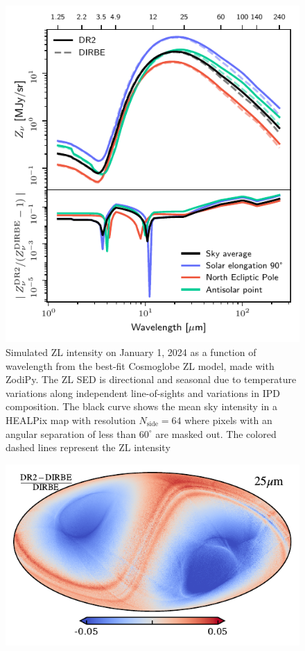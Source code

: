 \documentclass[twocolumn]{aa}
\begin{document}
\begin{figure}
    \centering
    \includegraphics[width=\columnwidth]{figs/zodi_intensity.pdf}
    \caption{Simulated ZL intensity on January 1, 2024 as a function of wavelength from the best-fit 
    Cosmoglobe ZL model, made with ZodiPy. The ZL SED is directional 
    and seasonal due to temperature variations along independent line-of-sights and variations in IPD composition. 
    The black curve shows the mean sky intensity in a HEALPix map with resolution
    $N_\mathrm{side}= 64$ where pixels with an angular separation of less than
    $60^\circ$ are masked out. The colored dashed lines represent the ZL 
    intensity
    }
    \label{fig:zodi-intensity}
\end{figure}

\begin{figure}
    \centering
    \includegraphics[width=\columnwidth]{figs/zodi_reldiff.pdf}
    \caption{}
    \label{fig:reldiff}
\end{figure}
\end{document}
